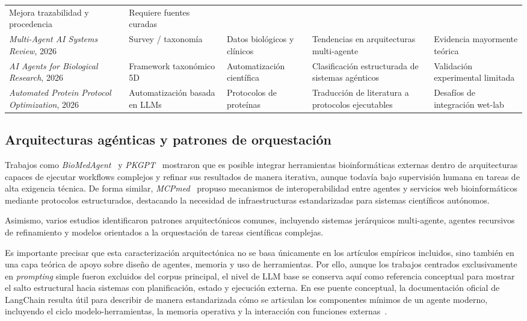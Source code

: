 \begin{longtable}{p{3.0cm} p{2.8cm} p{2.7cm} p{3.5cm} p{2.6cm}}
Mejora trazabilidad y procedencia &
Requiere fuentes curadas \\
\addlinespace
\textit{Multi-Agent AI Systems Review}, 2026 &
Survey / taxonomía &
Datos biológicos y clínicos &
Tendencias en arquitecturas multi-agente &
Evidencia mayormente teórica \\
\addlinespace
\textit{AI Agents for Biological Research}, 2026 &
Framework taxonómico 5D &
Automatización científica &
Clasificación estructurada de sistemas agénticos &
Validación experimental limitada \\
\addlinespace
\textit{Automated Protein Protocol Optimization}, 2026 &
Automatización basada en LLMs &
Protocolos de proteínas &
Traducción de literatura a protocolos ejecutables &
Desafíos de integración wet-lab \\
\end{longtable}


\subsection{Arquitecturas agénticas y patrones de orquestación}\label{subsec:architectures}

Trabajos como \textit{BioMedAgent}~\citep{41912700} y
\textit{PKGPT}~\citep{42076151} mostraron que es posible
integrar herramientas bioinformáticas externas dentro de arquitecturas capaces
de ejecutar workflows complejos y refinar sus resultados de manera iterativa,
aunque todavía bajo supervisión humana en tareas de alta exigencia técnica. De
forma similar, \textit{MCPmed}~\citep{41729821} propuso mecanismos de
interoperabilidad entre agentes y servicios web bioinformáticos mediante
protocolos estructurados, destacando la necesidad de infraestructuras
estandarizadas para sistemas científicos autónomos.

Asimismo, varios estudios identificaron patrones arquitectónicos comunes,
incluyendo sistemas jerárquicos multi-agente, agentes recursivos de refinamiento
y modelos orientados a la orquestación de tareas científicas complejas.

Es importante precisar que esta caracterización arquitectónica no se basa
únicamente en los artículos empíricos incluidos, sino también en una capa
teórica de apoyo sobre diseño de agentes, memoria y uso de herramientas. Por
ello, aunque los trabajos centrados exclusivamente en \textit{prompting} simple
fueron excluidos del corpus principal, el nivel de LLM base se conserva aquí
como referencia conceptual para mostrar el salto estructural hacia sistemas con
planificación, estado y ejecución externa. En ese puente conceptual, la
documentación oficial de LangChain resulta útil para describir de manera
estandarizada cómo se articulan los componentes mínimos de un agente moderno,
incluyendo el ciclo modelo-herramientas, la memoria operativa y la interacción
con funciones externas~\citep{LangChainAgents2026,LangChainMemory2026,LangChainTools2026}.

